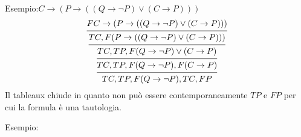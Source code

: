 Esempio:$C \rightarrow (P \rightarrow ((Q \rightarrow \neg P) \lor (C \rightarrow P)))$
\begin{equation*}
\begin{prooftree}
\hypo{F C \rightarrow (P \rightarrow ((Q \rightarrow \neg P) \lor (C \rightarrow P)))}
\infer1 {TC,F (P \rightarrow ((Q \rightarrow \neg P) \lor (C \rightarrow P)))}
\infer1 {TC,TP,F (Q \rightarrow \neg P) \lor (C \rightarrow P)}
\infer1 {TC,TP,F (Q \rightarrow \neg P),F (C \rightarrow P)}
\infer1{TC,TP,F (Q \rightarrow \neg P),TC,FP}
\end{prooftree}
\end{equation*}
Il tableaux chiude in quanto non può essere contemporaneamente $TP$ e $FP$ per cui
la formula è una tautologia.

Esempio:



